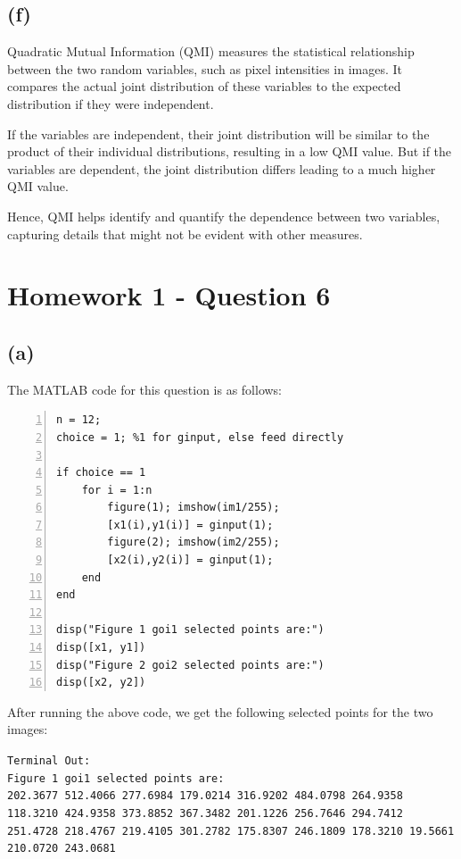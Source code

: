 \documentclass{article}
\begin{document}
\subsection*{(f)}
Quadratic Mutual Information (QMI) measures the statistical relationship between the two random variables, such as pixel intensities in images. It compares the actual joint distribution of these variables to the expected distribution if they were independent.
\vspace{5pt}

If the variables are independent, their joint distribution will be similar to the product of their individual distributions, resulting in a low QMI value. But if the variables are dependent, the joint distribution differs leading to a much higher QMI value.
\vspace{5pt}

Hence, QMI helps identify and quantify the dependence between two variables, capturing details that might not be evident with other measures.

\newpage
\section{Homework 1 - Question 6}

\subsection*{(a)}

The MATLAB code for this question is as follows:
\begin{lstlisting}[frame=single,numbers=left,style=Matlab-Pyglike,breaklines=true,postbreak=\mbox{\textcolor{red}{$\hookrightarrow$}\space}]    
n = 12;
choice = 1; %1 for ginput, else feed directly

if choice == 1
    for i = 1:n
        figure(1); imshow(im1/255); 
        [x1(i),y1(i)] = ginput(1);
        figure(2); imshow(im2/255); 
        [x2(i),y2(i)] = ginput(1);
    end
end

disp("Figure 1 goi1 selected points are:")
disp([x1, y1])
disp("Figure 2 goi2 selected points are:")
disp([x2, y2])
\end{lstlisting}

After running the above code, we get the following selected points for the two images:

\texttt{Terminal Out:\\
Figure 1 goi1 selected points are:\\
   202.3677  512.4066  277.6984  179.0214  316.9202  484.0798  264.9358  118.3210  424.9358  373.8852  367.3482  201.1226  256.7646  294.7412  251.4728  218.4767  219.4105  301.2782  175.8307  246.1809  178.3210   19.5661  210.0720  243.0681
}
\end{document}
